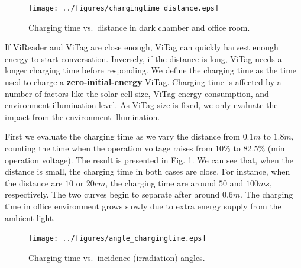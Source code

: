 \begin{figure}[!ht]
\centering
\texttt{[image: ../figures/chargingtime\_distance.eps]}
\vskip -0.05in
\caption{Charging time vs.\ distance in dark chamber and office room.}\label{fig:charging_distance}
\vskip -0.05in
\end{figure}

If ViReader and ViTag are close enough, ViTag can quickly harvest enough energy to start conversation. Inversely, if the distance is long, ViTag needs a longer charging time before responding. We define the charging time as the time used to charge a \textbf{zero-initial-energy} ViTag. Charging time is affected by a number of factors like the solar cell size, ViTag energy consumption, and environment illumination level. %
As ViTag size is fixed, we only evaluate the impact from the environment illumination. 

First we evaluate the charging time as we vary the distance from $0.1m$ to $1.8m$, counting the time when the operation voltage raises from $10\%$ to $82.5\%$ (min operation voltage). The result is presented in Fig. \ref{fig:charging_distance}. We can see that, when the distance is small, the charging time in both cases are close. For instance, when the distance are $10$ or $20cm$, the charging time are around $50$ and $100ms$, respectively. The two curves begin to separate after around $0.6m$. The charging time in office environment grows slowly due to extra energy supply from the ambient light.


%

\begin{figure}[!ht]
\centering
\texttt{[image: ../figures/angle\_chargingtime.eps]}
\vskip -0.05in
\caption{Charging time vs.\ incidence (irradiation) angles.}\label{fig:charging_angle}
\vskip -0.05in
\end{figure}

